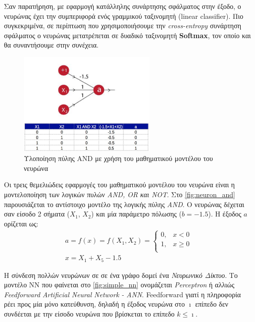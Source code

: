 Σαν παρατήρηση, με εφαρμογή κατάλληλης
συνάρτησης σφάλματος στην έξοδο, ο νευρώνας έχει την συμπεριφορά ενός γραμμικού ταξινομητή
(linear classifier). Πιο συγκεκριμένα, σε περίπτωση που χρησιμοποιήσουμε την \emph{cross-entropy}
συνάρτηση σφάλματος ο νευρώνας μετατρέπεται σε δυαδικό ταξινομητή \textbf{Softmax},
τον οποίο και θα συναντήσουμε στην συνέχεια.

\begin{figure}[!ht]
  \centering
  \includegraphics[width=0.6\textwidth]{./images/chapter3/perceptron_and.jpg}
  \caption[Υλοποίηση πύλης AND με χρήση του μαθηματικού μοντέλου του νευρώνα]{Υλοποίηση πύλης AND με χρήση του μαθηματικού μοντέλου του νευρώνα}
  \label{fig:neuron_and}
\end{figure}

Οι τρεις θεμελιώδεις εφαρμογές του μαθηματικού μοντέλου του νευρώνα είναι η
μοντελοποίηση των λογικών πυλών \emph{AND, OR και NOT}. Στο \autoref{fig:neuron_and}
παρουσιάζεται το αντίστοιχο μοντέλο της λογικής πύλης \emph{AND}. Ο νευρώνας
δέχεται σαν είσοδο 2 σήματα ($X_{1}$,  $X_{2}$) και μία παράμετρο πόλωσης ($b=-1.5$).
Η έξοδος $a$ ορίζεται ως:
\begin{gather*}
  a = f(x) = f(X_{1}, X_{2}) =
  \begin{cases}
    0, & x < 0 \\
    1, & x \geq 0 \\
  \end{cases} \\
   x = X_{1} + X_{5} - 1.5
\end{gather*}

Η σύνδεση πολλών νευρώνων σε σε ένα γράφο δομεί ένα \emph{Νευρωνικό Δίκτυο}.
Το μοντέλο ΝΝ που φαίνεται στο \autoref{fig:simple_nn}
ονομάζεται \emph{Perceptron} ή αλλιώς
\emph{Feedforward Artificial Neural Network - ANN}.
Feedforward γιατί η πληροφορία ρέει προς μία μόνο κατεύθυνση, δηλαδή
η έξοδος νευρώνα στο $\imath$ επίπεδο δεν συνδέεται με την είσοδο νευρώνα
που βρίσκεται το επίπεδο $k \leq \imath$.

